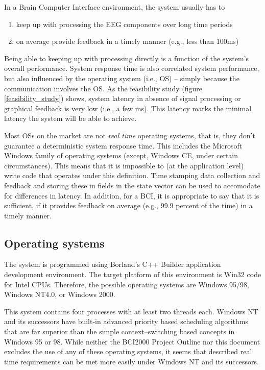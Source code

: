 In a Brain Computer Interface environment, the system usually has to 
\begin{enumerate}
 \item{keep up with processing the EEG components over long time periods}
 \item{on average provide feedback in a timely manner (e.g., less than 100ms)}
\end{enumerate}

Being able to keeping up with processing directly is a function of the system's 
overall performance. System response time is also correlated system performance, 
but also influenced by the operating system (i.e., OS) -- simply because the 
communication involves the OS. As the feasibility study (figure 
\ref{feasibility_study}) shows, system latency in absence of signal processing 
or graphical feedback is very low (i.e., a few ms). This latency marks the 
minimal latency the system will be able to achieve.

Most OSs on the market are not \textit{real time} operating systems, that is, 
they don't guarantee a deterministic system response time. This includes the 
Microsoft Windows family of operating systems (except, Windows CE, under certain 
circumstances). This means that it is impossible to (at the application level) 
write code that operates under this definition. Time stamping data collection 
and feedback and storing these in fields in the state vector can be used to 
accomodate for differences in latency. In addition, for a BCI, it is appropriate 
to say that it is sufficient, if it provides feedback on average (e.g., 99.9 
percent of the time) in a timely manner. 


\subsection{Operating systems}

The system is programmed using Borland's C++ Builder application development 
environment. The target platform of this environment is Win32 code for Intel 
CPUs. Therefore, the possible operating systems are Windows 95/98, Windows 
NT4.0, or Windows 2000.

This system contains four processes with at least two threads each. Windows NT 
and its successors have built-in advanced priority based scheduling algorithms 
that are far superior than the simple context--switching based concepts in 
Windows 95 or 98. While neither the BCI2000 Project Outline nor this document 
excludes the use of any of these operating systems, it seems that described real 
time requirements can be met more easily under Windows NT and its successors.


